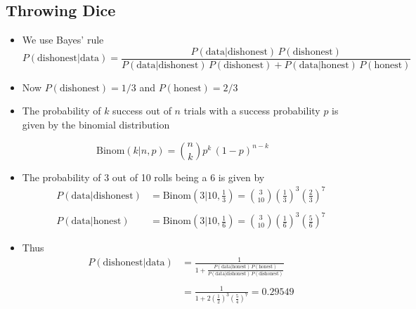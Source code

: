 \documentclass[11pt]{article}
\begin{document}
\subsection{Throwing Dice}
\label{sec:org3f21278}
\begin{itemize}
\item We use Bayes' rule
$$ P(\text{dishonest}|\text{data}) = \frac{P(\text{data}|\text{dishonest})
      \,P(\text{dishonest} )}
      {P(\text{data}|\text{dishonest})\,P(\text{dishonest} ) +
      P(\text{data}|\text{honest})\,P(\text{honest})} $$
\item Now \(P(\text{dishonest} )=1/3\) and \(P(\text{honest})=2/3\)
\item The probability of \(k\) success out of \(n\) trials with a success
probability \(p\) is given by the binomial distribution
\end{itemize}
$$\mathrm{Binom}(k|n,p) = \binom{n}{k} p^k\,(1-p)^{n-k} $$
\begin{itemize}
\item The probability of 3 out of 10 rolls being a 6 is given by
\begin{align*}
P(\text{data}|\text{dishonest}) &=
\mathrm{Binom}(3|10,\tfrac{1}{3}) = \binom{3}{10}
\left(\frac{1}{3}\right)^3  \left(\frac{2}{3}\right)^7\\ \\
P(\text{data}|\text{honest}) &=
\mathrm{Binom}(3|10,\tfrac{1}{6}) =  \binom{3}{10}
\left(\frac{1}{6}\right)^3  \left(\frac{5}{6}\right)^7
\end{align*}
\item Thus
\begin{align*}
P(\text{dishonest}|\text{data}) &= \frac{1}{1 +
  \frac{P(\text{data}|\text{honest})\,P(\text{honest})}
  {P(\text{data}|\text{dishonest})\,P(\text{dishonest})}} \\ \\
&= \frac{1}{1 + 2 \left(\frac{1}{2}\right)^3
  \left(\frac{5}{4}\right)^7} = 0.29549 \\
\end{align*}
\end{itemize}
\end{document}
